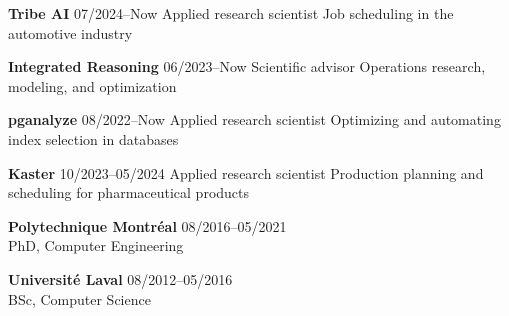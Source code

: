 \documentclass{memoir}
\begin{document}
\par
\vspace{1.5\baselineskip}
\begin{list}{}{
    \setlength\leftmargin{1.2in}
    \setlength\rightmargin{0in}
    \setlength{}
    \setlength{}
    \setlength\listparindent{0in}
    \setlength\itemindent{0in}
    \setlength\parskip{0in}
    \setlength\topsep{0in}
    \setlength\parsep{0in}
    \setlength\itemsep{0.90\baselineskip}
    \setlength\partopsep{0in}}

  


  \Item \textbf{Tribe AI} \hfill 07/2024--Now
  \BulletItem Applied research scientist
  \BulletItem Job scheduling in the automotive industry
  
  \Item \textbf{Integrated Reasoning} \hfill 06/2023--Now
  \BulletItem Scientific advisor
  \BulletItem Operations research, modeling, and optimization
  
  \Item \textbf{pganalyze} \hfill 08/2022--Now
  \BulletItem Applied research scientist
  \BulletItem Optimizing and automating index selection in databases

  \Item \textbf{Kaster} \hfill 10/2023--05/2024
  \BulletItem Applied research scientist
  \BulletItem Production planning and scheduling for pharmaceutical products




  

  \Item \textbf{Polytechnique Montréal} \hfill 08/2016--05/2021 \\
  PhD, Computer Engineering

  \Item \textbf{Université Laval} \hfill 08/2012--05/2016 \\
  BSc, Computer Science

  

  

\end{list}
\end{document}

